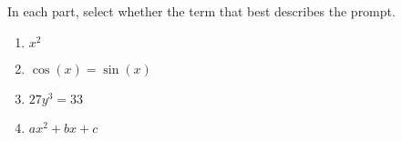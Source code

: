 \documentclass{ximera}
\author{Kenneth Berglund}
\begin{document}
\begin{exercise}
In each part, select whether the term that best describes the prompt.

\begin{enumerate}
\item $x^2$
\begin{multipleChoice}
\end{multipleChoice}

\item $\cos(x) = \sin(x)$
\begin{multipleChoice}
\end{multipleChoice}

\item $27y^3 = 33$
\begin{multipleChoice}
\end{multipleChoice}

\item $ax^2 + bx + c$
\begin{multipleChoice}
\end{multipleChoice}

\end{enumerate}

\end{exercise}
\end{document}
